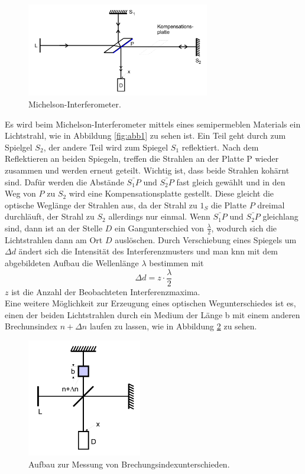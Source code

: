 \begin{figure}
    \centering
    \includegraphics[width=8cm]{data/abb2.png}
    \caption{Michelson-Interferometer. \cite{sample}}
    \label{fig:abb2}
\end{figure}
\FloatBarrier
Es wird beim Michelson-Interferometer mittels eines semipermeblen Materials ein Lichtstrahl, wie in Abbildung \ref{fig:abb1} zu sehen ist.
Ein Teil geht durch zum Spielgel $S_2$, der andere Teil wird zum Spiegel $S_1$ reflektiert.
Nach dem Reflektieren an beiden Spiegeln, treffen die Strahlen an der Platte P wieder zusammen und werden erneut geteilt.
Wichtig ist, dass beide Strahlen kohärnt sind.
Dafür werden die Abstände $\bar{S_1P} \text{ und } \bar{S_2P}$ fast gleich gewählt und in den Weg von $P$ zu $S_2$ wird eine Kompensationsplatte gestellt.
Diese gleicht die optische Weglänge der Strahlen aus, da der Strahl zu $1_S$ die Platte $P$ dreimal durchläuft, der Strahl zu $S_2$ allerdings nur einmal.
Wenn $\bar{S_1P} \text{ und } \bar{S_2P}$ gleichlang sind, dann ist an der Stelle $D$ ein Gangunterschied von $\frac{\lambda}{2}$, wodurch sich die Lichtstrahlen dann am Ort $D$ auslöschen.
Durch Verschiebung eines Spiegels um $\Delta d$ ändert sich die Intensität des Interferenzmusters und man knn mit dem abgebildeten Aufbau die Wellenlänge $\lambda$ bestimmen mit
\begin{equation}
    \Delta d = z \cdot \frac{\lambda}{2}
    \label{eqn:gl1}
\end{equation}
$z$ ist die Anzahl der Beobachteten Interferenzmaxima. \\
Eine weitere Möglichkeit zur Erzeugung eines optischen Wegunterschiedes ist es,
einen der beiden Lichtstrahlen durch ein Medium der Länge b mit einem anderen Brechunsindex $n + \Delta n$ laufen zu lassen, wie in Abbildung \ref{fig:abb3} zu sehen.
\begin{figure}
    \centering
    \includegraphics[width=5cm]{data/abb3.png}
    \caption{Aufbau zur Messung von Brechungsindexunterschieden. \cite{sample}}
    \label{fig:abb3}
\end{figure}
